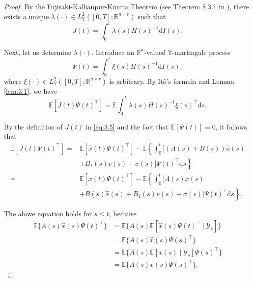 \documentclass[lettersize,journal]{IEEEtran}
\theoremstyle{plain}
\theoremstyle{definition}
\begin{document}
\begin{proof}
	By the Fujisaki-Kallianpur-Kunita Theorem (see Theorem 8.3.1 in \cite{Kallianpur1980}), there exists a unique $\lambda(\cdot) \in L_{\mathbb{Y}}^2([0,T];\mathbb{R}^{n \times r})$ such that
	\begin{equation*}
		J(t) = \int_{0}^{t} \lambda(s)H(s)^{-1}\mathrm{d}I(s).
	\end{equation*}
	
	Next, let us determine $\lambda(\cdot)$. Introduce an $\mathbb{R}^{n}$-valued $\mathbb{Y}$-martingale process 
	\begin{equation*}
		\Psi(t) = \int_{0}^{t} \xi(s)H(s)^{-1}\mathrm{d}I(s),
	\end{equation*}
	where $\xi(\cdot) \in L_{\mathbb{Y}}^2([0,T];\mathbb{R}^{n \times r})$ is arbitrary. By It\^{o}'s formula and Lemma \ref{lem:3.1}, we have
	\begin{equation}\label{eq:3.6}
		\mathbb{E}[J(t)\Psi(t)^{\top}] = \mathbb{E}\int_{0}^{t} \lambda(s)H(s)^{-1}\xi(s)^{\top}\mathrm{d}s.
	\end{equation}
	
	By the definition of $J(t)$ in \eqref{eq:3.5} and the fact that $\mathbb{E}[\Psi(t)] = 0$, it follows that
	\begin{equation}\label{eq:3.7}
		\begin{aligned}
			\mathbb{E}[J(t)\Psi(t)^{\top}] =& \mathbb{E}[\widehat{x}(t)\Psi(t)^{\top}] - \mathbb{E}\left\{\int_{0}^{t} \Big[(A(s) + B(s))\widehat{x}(s) \right.\\
			&\left. + B_1(s)v(s) + \sigma(s)\Big]\Psi(t)^{\top}\mathrm{d}s\right\}\\
			=&\mathbb{E}[x(t)\Psi(t)^{\top}] - \mathbb{E}\left\{\int_{0}^{t} \Big[A(s)x(s) \right.\\
			&\left.+ B(s)\widehat{x}(s) + B_1(s)v(s) + \sigma(s)\Big]\Psi(t)^{\top}\mathrm{d}s\right\}.
		\end{aligned}
	\end{equation}
	
	The above equation holds for $s \leq t$, because
	\begin{equation*}
		\begin{aligned}
			\mathbb{E} \Big\{A(s)\widehat{x}(s)\Psi(t)^\top\Big\} &= \mathbb{E}\Big\{A(s) \mathbb{E}[\widehat{x}(s)\Psi(t)^{\top} \mid \mathcal{Y}_s]\Big\} \\
			&= \mathbb{E}\Big\{A(s)\widehat{x}(s)\Psi(s)^\top\Big\}\\
			& = \mathbb{E}\Big\{A(s)\mathbb{E}[x(s) \mid \mathcal{Y}_s]\Psi(s)^\top\Big\} \\
			&= \mathbb{E}\Big\{A(s)x(s)\Psi(s)^\top\Big\}.
		\end{aligned}
	\end{equation*}
	

\end{proof}
\end{document}
